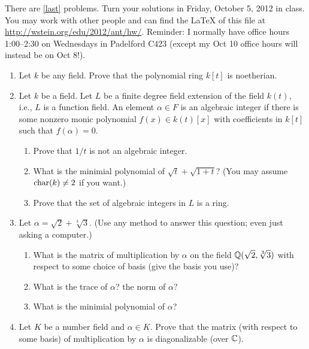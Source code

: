 \documentclass{article}
\title{\dred{Math 581e, Fall 2012, Homework 2}}
\author{William Stein ({\tt wstein@uw.edu})}
\date{Due: Friday, October 12, 2012}
\begin{document}
\maketitle

{\color{dbluecolor}There are \ref{last} problems. Turn your solutions in Friday, October
5, 2012 in class.  You may work with other people and can find the
\LaTeX{} of this file at \url{http://wstein.org/edu/2012/ant/hw/}.
Reminder: I normally have office hours 1:00--2:30 on Wednesdays in Padelford
C423 (except my Oct 10 office hours will instead be on Oct 8!).}

\begin{enumerate}

\item  Let $k$ be any field.  Prove that the polynomial ring $k[t]$ is noetherian.  
\item Let $k$ be a field.  Let $L$ be a finite degree field extension
  of the field $k(t)$, i.e., $L$ is a function field.  An element
  $\alpha \in F$ is an algebraic integer if there is some nonzero monic
  polynomial $f(x) \in k(t)[x]$ with coefficients in $k[t]$ such that
  $f(\alpha)=0$.
\begin{enumerate}
 \item  Prove that $1/t$ is not an algebraic integer.
 \item What is the minimial polynomial of $\sqrt{t} + \sqrt{1+t}$?  (You may assume $\operatorname{char}(k)\neq 2$ if you want.)
 \item Prove that the set of algebraic integers in $L$ is a ring. 
\end{enumerate}
\item Let $\alpha = \sqrt{2} + \sqrt[3]{3}$.     (Use any method to answer this question; even just asking a computer.)
\begin{enumerate}
\item What is the matrix of multiplication by $\alpha$ on the field $\mathbb{Q}(\sqrt{2}, \sqrt[3]{3})$ 
with respect to some choice of basis (give the basis you use)?
\item What is the trace of $\alpha$? the norm of $\alpha$?
\item What is the minimial polynomial of $\alpha$?  
\end{enumerate}

\item\label{last} Let $K$ be a number field and $\alpha \in K$.  Prove
  that the matrix (with respect to some basis) of multiplication by
  $\alpha$ is diagonalizable (over $\mathbb{C}$).


\end{enumerate}
\end{document}
